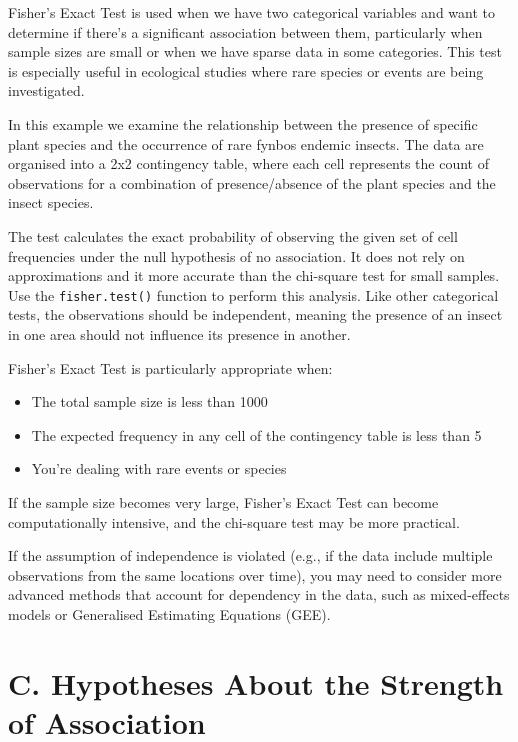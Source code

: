 \documentclass[
  letterpaper,
]{book}
\providecommand{\tightlist}{%
  \setlength{\itemsep}{0pt}\setlength{\parskip}{0pt}}\usepackage{longtable,booktabs,array}
\begin{document}
Fisher's Exact Test is used when we have two categorical variables and
want to determine if there's a significant association between them,
particularly when sample sizes are small or when we have sparse data in
some categories. This test is especially useful in ecological studies
where rare species or events are being investigated.

In this example we examine the relationship between the presence of
specific plant species and the occurrence of rare fynbos endemic
insects. The data are organised into a 2x2 contingency table, where each
cell represents the count of observations for a combination of
presence/absence of the plant species and the insect species.

The test calculates the exact probability of observing the given set of
cell frequencies under the null hypothesis of no association. It does
not rely on approximations and it more accurate than the chi-square test
for small samples. Use the \texttt{fisher.test()} function to perform
this analysis. Like other categorical tests, the observations should be
independent, meaning the presence of an insect in one area should not
influence its presence in another.

Fisher's Exact Test is particularly appropriate when:

\begin{itemize}
\tightlist
\item
  The total sample size is less than 1000
\item
  The expected frequency in any cell of the contingency table is less
  than 5
\item
  You're dealing with rare events or species
\end{itemize}

If the sample size becomes very large, Fisher's Exact Test can become
computationally intensive, and the chi-square test may be more
practical.

If the assumption of independence is violated (e.g., if the data include
multiple observations from the same locations over time), you may need
to consider more advanced methods that account for dependency in the
data, such as mixed-effects models or Generalised Estimating Equations
(GEE).

\section{C. Hypotheses About the Strength of
Association}\label{sec-pearson}
\end{document}
